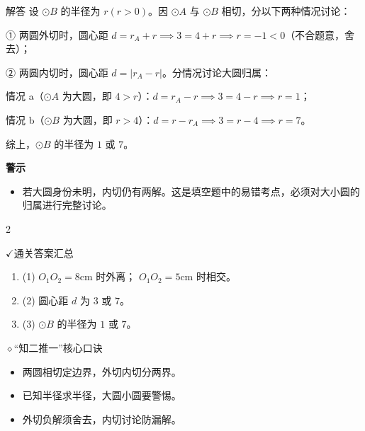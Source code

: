 \documentclass{exam-zh}
\newcommand{\eduIconCheck}{\(\checkmark\)}
\newcommand{\eduIconPin}{\(\diamond\)}
\newenvironment{eduBulletList}{%
  \begin{itemize}[
    label=\textbullet,
    leftmargin=5mm,
    itemsep=1.2mm,
    topsep=0pt,
    parsep=0pt
  ]
}{%
  \end{itemize}
}
\newenvironment{eduBottomGrid}{%
  \columnratio{0.32, 0.68}%
  \setlength{\columnsep}{11mm}%
  \columnseprule=0pt%
  \begin{paracol}{2}%
}{%
  \end{paracol}%
}
\newenvironment{eduSummaryLeft}{%
}{%
}
\newcommand{\eduSummaryDivider}{%
  \switchcolumn
}
\newenvironment{eduSummaryRight}{%
}{%
}
\newenvironment{eduPlainList}{%
  \begin{enumerate}[
    label=(\arabic*),
    leftmargin=7mm,
    itemsep=1.2mm,
    topsep=0pt,
    parsep=0pt
  ]
}{%
  \end{enumerate}
}
\begin{document}
\begin{eduSolutionBox}{解答}
  \begingroup
  \setlength{\parskip}{2.5mm}
设 $\odot B$ 的半径为 $r(r>0)$。因 $\odot A$ 与 $\odot B$ 相切，分以下两种情况讨论：\par
① 两圆外切时，圆心距 $d = r_A + r \implies 3 = 4 + r \implies r = -1 < 0$（不合题意，舍去）；\par
② 两圆内切时，圆心距 $d = |r_A - r|$。分情况讨论大圆归属：\par
\quad 情况 a（$\odot A$ 为大圆，即 $4 > r$）：$d = r_A - r \implies 3 = 4 - r \implies r = 1$；\par
\quad 情况 b（$\odot B$ 为大圆，即 $r > 4$）：$d = r - r_A \implies 3 = r - 4 \implies r = 7$。\par
综上，$\odot B$ 的半径为 $1$ 或 $7$。\par
  \endgroup
  \vspace{2.5mm}
  {\color{edu-blue}\bfseries\small 警示}\par\vspace{1.5mm}
  \begin{eduBulletList}
    \item 若大圆身份未明，内切仍有两解。这是填空题中的易错考点，必须对大小圆的归属进行完整讨论。  \end{eduBulletList}
\end{eduSolutionBox}




\begin{eduBottomGrid}
  \begin{eduSummaryLeft}
    \begin{eduSummaryBlock}{\eduIconCheck}{通关答案汇总}
    \begin{eduPlainList}
      \item (1) $O_1O_2=8\text{cm}$ 时外离； $O_1O_2=5\text{cm}$ 时相交。      \item (2) 圆心距 $d$ 为 $3$ 或 $7$。      \item (3) $\odot B$ 的半径为 $1$ 或 $7$。    \end{eduPlainList}
    \end{eduSummaryBlock}
  \end{eduSummaryLeft}
  \eduSummaryDivider
  \begin{eduSummaryRight}
    \begin{eduSummaryBlock}{\eduIconPin}{“知二推一”核心口诀}
    \begin{eduBulletList}
      \item 两圆相切定边界，外切内切分两界。      \item 已知半径求半径，大圆小圆要警惕。      \item 外切负解须舍去，内切讨论防漏解。    \end{eduBulletList}
    \end{eduSummaryBlock}
  \end{eduSummaryRight}
\end{eduBottomGrid}
\end{document}
